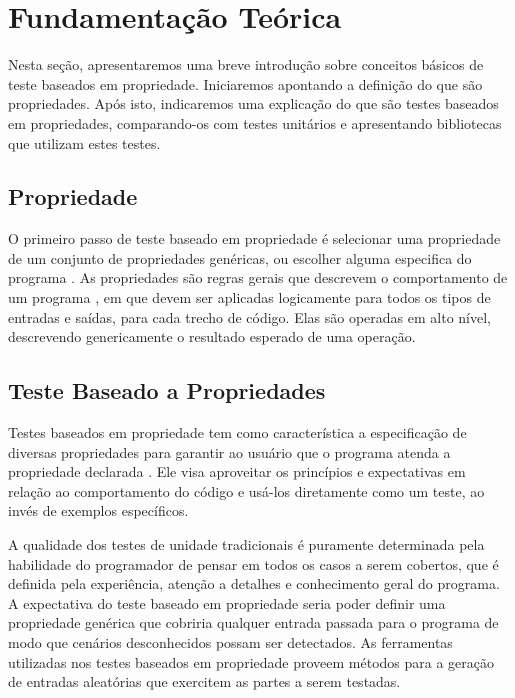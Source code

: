 \section{Fundamentação Teórica} \label{sec:trabalhos_relacioandos}
 Nesta seção, apresentaremos uma breve introdução sobre conceitos básicos de teste baseados em propriedade. Iniciaremos apontando a definição do que são propriedades. Após isto, indicaremos uma explicação do que são testes baseados em propriedades, comparando-os com testes unitários e apresentando bibliotecas que utilizam estes testes. %
 
 \subsection{Propriedade}
 O primeiro passo de teste baseado em propriedade é selecionar uma propriedade de um conjunto de propriedades genéricas, ou escolher alguma especifica do programa \cite{fink1997property}. As propriedades são regras gerais que descrevem o comportamento de um programa \cite{9781680506211}, em que devem ser aplicadas logicamente para todos os tipos de entradas e saídas, para cada trecho de código. Elas são operadas em alto nível, descrevendo genericamente o resultado esperado de uma operação. 
 
 \subsection{Teste Baseado a Propriedades}
 Testes baseados em propriedade tem como característica a especificação de diversas propriedades para garantir ao usuário que o programa atenda a propriedade declarada \cite{fink1997property}. Ele visa aproveitar os princípios e expectativas em relação ao comportamento do código e usá-los diretamente como um teste, ao invés de exemplos específicos. 
 
 A qualidade dos testes de unidade tradicionais é puramente determinada pela habilidade do programador de pensar em todos os casos a serem cobertos, que é definida pela experiência, atenção a detalhes e conhecimento geral do programa. A expectativa do teste baseado em propriedade seria poder definir uma propriedade genérica que cobriria qualquer entrada passada para o programa de modo que cenários desconhecidos possam ser detectados. As ferramentas utilizadas nos testes baseados em propriedade proveem métodos para a geração de entradas aleatórias que exercitem as partes a serem testadas.
 
